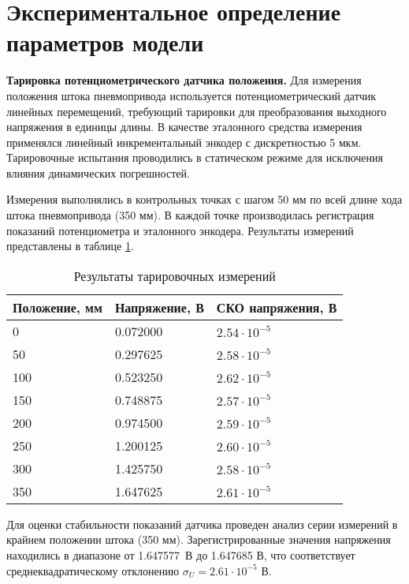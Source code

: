 \section{Экспериментальное определение параметров модели}

\textbf{Тарировка потенциометрического датчика положения.}
Для измерения положения штока пневмопривода используется потенциометрический датчик линейных перемещений,
требующий тарировки для преобразования выходного напряжения в единицы длины. В качестве эталонного средства
измерения применялся линейный инкрементальный энкодер с дискретностью 5 мкм. Тарировочные испытания проводились
в статическом режиме для исключения влияния динамических погрешностей.

Измерения выполнялись в контрольных точках с шагом 50 мм по всей длине хода штока пневмопривода (350 мм).
В каждой точке производилась регистрация показаний потенциометра и эталонного энкодера.
Результаты измерений представлены в таблице \ref{tab:calibration_data}.

\begin{table}[ht]
	\centering
	\caption{Результаты тарировочных измерений}\label{tab:calibration_data}
	\small
	\begin{tabular}{lll}
		\hline
		\textbf{Положение}, мм & \textbf{Напряжение}, В & \textbf{СКО напряжения}, В \\
		\hline
		0                      & \num{0.072000}         & $\num{2.54}\cdot 10^{-5}$  \\
		50                     & \num{0.297625}         & $\num{2.58}\cdot 10^{-5}$  \\
		100                    & \num{0.523250}         & $\num{2.62}\cdot 10^{-5}$  \\
		150                    & \num{0.748875}         & $\num{2.57}\cdot 10^{-5}$  \\
		200                    & \num{0.974500}         & $\num{2.59}\cdot 10^{-5}$  \\
		250                    & \num{1.200125}         & $\num{2.60}\cdot 10^{-5}$  \\
		300                    & \num{1.425750}         & $\num{2.58}\cdot 10^{-5}$  \\
		350                    & \num{1.647625}         & $\num{2.61}\cdot 10^{-5}$  \\
		\hline
	\end{tabular}
\end{table}

Для оценки стабильности показаний датчика проведен анализ серии измерений в крайнем положении штока
(350 мм). Зарегистрированные значения напряжения находились в диапазоне от \num{1.647577}~В до \num{1.647685} В,
что соответствует среднеквадратическому отклонению $\sigma_U = \num{2.61} \cdot 10^{-5}$ В.

